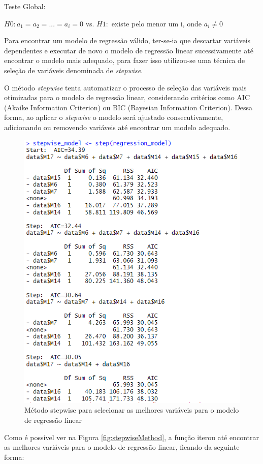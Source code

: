 \documentclass[%
 aip,
cp,  %
 amsmath,amssymb,%
 reprint,%
]{revtex4-2}
\begin{document}
Teste Global: 
\begin{center}
        $H0:  a_{1} = a_{2} = ... = a_{i} = 0 $\hspace{0.5cm}
    vs. \hspace{0.5cm}
   $ H1:$  existe pelo menor um i, onde $a_{i} \ne 0$
\end{center}



Para encontrar um modelo de regressão válido, ter-se-ia que descartar variáveis dependentes e executar de novo o modelo de regressão linear sucessivamente até encontrar o modelo mais adequado, para fazer isso utilizou-se uma técnica de seleção de variáveis denominada de \textit{stepwise}.

O método \textit{stepwise} tenta automatizar o processo de seleção das variáveis mais otimizadas para o modelo de regressão linear, considerando critérios como AIC (Akaike Information Criterion) ou BIC (Bayesian Information Criterion). Dessa forma, ao aplicar o \textit{stepwise} o modelo será ajustado consecutivamente, adicionando ou removendo variáveis até encontrar um modelo adequado.


  \begin{figure}
      \centering
      \includegraphics[width=0.6\linewidth]{imagens//questao4/stepwisePergunta4.png}
      \caption{Método stepwise para selecionar as melhores variáveis para o modelo de regressão linear}
      \label{fig:stepwisePergunta4}
  \end{figure}

  Como é possível ver na Figura \ref{fig:stepwiseMethod}, a função iterou até encontrar as melhores variáveis para o modelo de regressão linear, ficando da seguinte forma: 
  
\end{document}
